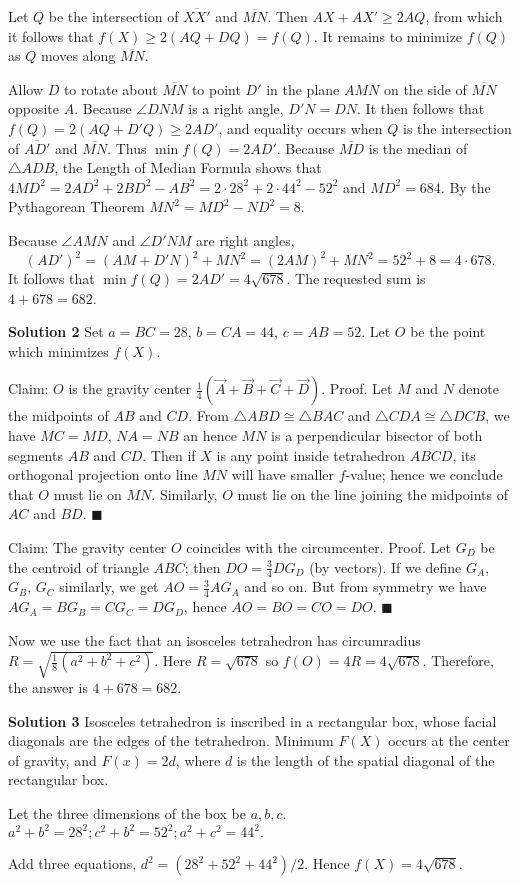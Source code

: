 \documentclass[a4paper,11pt]{article}
\begin{document}
Let $Q$ be the intersection of $\overline{XX'}$ and $\overline{MN}$. Then $AX+AX'\geq 2AQ$, from which it follows that $f(X) \geq 2(AQ+DQ) = f(Q)$. It remains to minimize $f(Q)$ as $Q$ moves along $\overline{MN}$.

Allow $D$ to rotate about $\overline{MN}$ to point $D'$ in the plane $AMN$ on the side of $\overline{MN}$ opposite $A$. Because $\angle DNM$ is a right angle, $D'N=DN$. It then follows that $f(Q) = 2(AQ+D'Q)\geq 2AD'$, and equality occurs when $Q$ is the intersection of $\overline{AD'}$ and $\overline{MN}$. Thus $\min f(Q) = 2AD'$. Because $\overline{MD}$ is the median of $\triangle ADB$, the Length of Median Formula shows that $4MD^2 = 2AD^2 + 2BD^2 - AB^2 = 2\cdot 28^2 + 2 \cdot 44^2 - 52^2$ and $MD^2 = 684$. By the Pythagorean Theorem $MN^2 = MD^2 - ND^2 = 8$.

Because $\angle AMN$ and $\angle D'NM$ are right angles, \[(AD')^2 = (AM+D'N)^2 + MN^2 = (2AM)^2 + MN^2 = 52^2 + 8 = 4\cdot 678.\]It follows that $\min f(Q) = 2AD' = 4\sqrt{678}$. The requested sum is $4+678=\boxed{682}$.

\textbf{Solution 2}
Set $a=BC=28$, $b=CA=44$, $c=AB=52$. Let $O$ be the point which minimizes $f(X)$.

Claim:  $O$ is the gravity center $\tfrac14(\vec A + \vec B + \vec C + \vec D)$. Proof. Let $M$ and $N$ denote the midpoints of $AB$ and $CD$. From $\triangle ABD \cong \triangle BAC$ and  $\triangle CDA \cong \triangle DCB$, we have  $MC=MD$, $NA=NB$ an hence $MN$ is a perpendicular bisector of both segments $AB$ and $CD$. Then if $X$ is any point inside tetrahedron $ABCD$, its orthogonal projection onto line $MN$ will have smaller $f$-value; hence we conclude that $O$ must lie on $MN$. Similarly, $O$ must lie on the line joining the midpoints of $AC$ and $BD$. $\blacksquare$

Claim: The gravity center $O$ coincides with the circumcenter. Proof. Let $G_D$ be the centroid of triangle $ABC$; then $DO = \tfrac 34 DG_D$ (by vectors). If we define $G_A$, $G_B$, $G_C$ similarly, we get $AO = \tfrac 34 AG_A$ and so on. But from symmetry we have $AG_A = BG_B = CG_C = DG_D$, hence $AO = BO = CO = DO$. $\blacksquare$

Now we use the fact that an isosceles tetrahedron has circumradius $R = \sqrt{\frac18(a^2+b^2+c^2)}$. Here $R = \sqrt{678}$ so $f(O) = 4R = 4\sqrt{678}$. Therefore, the answer is $4 + 678 = \boxed{682}$.

\textbf{Solution 3}
Isosceles tetrahedron is inscribed in a rectangular box, whose facial diagonals are the edges of the tetrahedron. Minimum $F(X)$ occurs at the center of gravity, and $F(x)= 2d$, where $d$ is the length of the spatial diagonal of the rectangular box.

Let the three dimensions of the box be $a, b, c$. $a^2+b^2=28^2;   c^2+b^2=52^2;   a^2+c^2=44^2.$

Add three equations, $d^2=(28^2+52^2+44^2)/2$. Hence $f(X)=4\sqrt {678}$.
\end{document}

